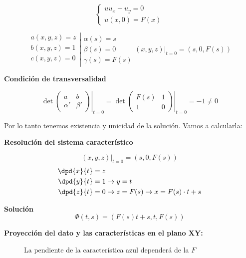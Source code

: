 	\begin{example}{1}
		\[\left\{ \begin{array}{l} uu_x + u_y = 0 \\ u(x,0) = F(x) \end{array}\right.\]

		\[ \left.\begin{array}{r}
		a(x,y,z) = z \\
		b(x,y,z) = 1 \\
		c(x,y,z) = 0 \\
		\end{array} \right| \begin{array}{l}
		\alpha(s) = s \\
		\beta(s) = 0 \\
		\gamma(s) = F(s) \end{array}
		(x,y,z)|_{t=0} = (s,0,F(s))
		\]

		\textbf{Condición de transversalidad}

		\[\det \left.\begin{pmatrix}
		a & b \\
		\alpha' & \beta'
		\end{pmatrix} \right|_{t=0}  = \det \left. \begin{pmatrix}
		F(s) & 1 \\
		1 & 0
		\end{pmatrix} \right|_{t=0} = -1 \neq 0\]

		Por lo tanto tenemos existencia y unicidad de la solución. Vamos a calcularla:

		\textbf{Resolución del sistema característico}

		\[ (x,y,z) |_{t=0} = (s,0,F(s)) \]
		\begin{align*}
		\dpd{x}{t} &= z \\
		\dpd{y}{t} &= 1 \rightarrow y = t \\
		\dpd{z}{t} &= 0 \rightarrow z = F(s) \rightarrow x = F(s)\cdot t + s
		\end{align*}


		\textbf{Solución}
		\[\Phi(t,s) = (F(s)t+s, t, F(s))\]

		{\bf Proyección del dato y las características en el plano XY:}

		\begin{figure}[hbtp]
			\caption{La pendiente de la característica azul dependerá de la $F$}
			\label{fig:Ejemplo-02-09-proyXY}
		\end{figure}


\end{example}

